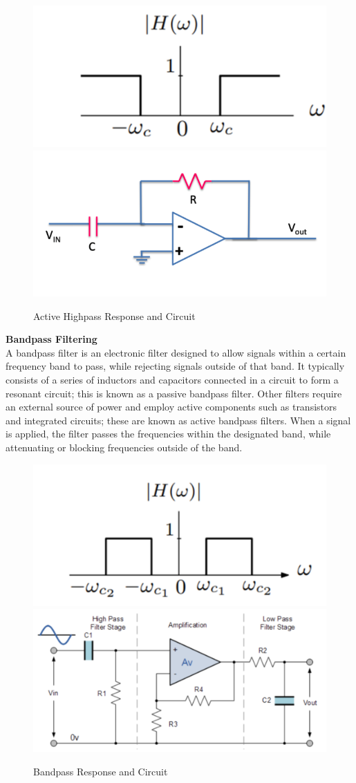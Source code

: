 \documentclass[12pt,a4paper]{article}
\begin{document}
				\begin{figure}[H]
					\begin{center}
						\includegraphics[width=0.6\linewidth]{Highpass}
						\includegraphics[width=0.6\linewidth]{Highpass_circuit}
					\end{center}
					\caption{Active Highpass Response and Circuit}
				\end{figure}
			\textbf{Bandpass Filtering}\\
				A bandpass filter is an electronic filter designed to allow signals within a certain frequency band to pass, while rejecting signals outside of that band. It typically consists of a
				series of inductors and capacitors connected in a circuit to form a resonant circuit; this is known as a passive bandpass filter. Other filters require an external source of power and
				employ active components such as transistors and integrated circuits; these are known as active bandpass filters.\cite{Bandpass}
				When a signal is applied, the filter passes the frequencies within the designated band, while attenuating or blocking frequencies outside of the band.
				\begin{figure}[H]
					\begin{center}
						\includegraphics[width=0.6\linewidth]{Bandpass}
						\includegraphics[width=0.6\linewidth]{Bandpass_Circuit}
					\end{center}
					\caption{Bandpass Response and Circuit}
					\label{fig:BANDPASS}
				\end{figure}
\end{document}
